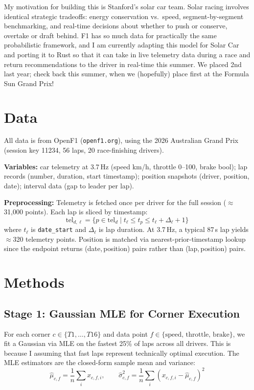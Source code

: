 \documentclass[10pt,twocolumn]{article}
\begin{document}
My motivation for building this is Stanford's solar car team. Solar racing involves identical
strategic tradeoffs: energy conservation vs.\ speed, segment-by-segment
benchmarking, and real-time decisions about whether to push or conserve, overtake or draft behind.
F1 has so much data for practically the same probabilistic framework, and I am
currently adapting this model for Solar Car and porting it to Rust so that it can take in
live telemetry data during a race and return recommendations to the driver in real-time this summer.
We placed 2nd last year; check back this summer, when we (hopefully) place first at the
Formula Sun Grand Prix!

\section{Data}

All data is from OpenF1 (\texttt{openf1.org}), using the 2026 Australian Grand
Prix (session key 11234, 56 laps, 20 race-finishing drivers).

\textbf{Variables:} car telemetry at 3.7\,Hz (speed km/h, throttle 0--100,
brake bool); lap records (number, duration, start timestamp); position snapshots
(driver, position, date); interval data (gap to leader per lap).

\textbf{Preprocessing:} Telemetry is fetched once per driver for the full
session ($\approx$31,000 points). Each lap is sliced by timestamp:
\[
  \text{tel}_{d,\ell} = \{p \in \text{tel}_d \mid t_\ell \le t_p \le t_\ell + \Delta_\ell + 1\}
\]
where $t_\ell$ is \texttt{date\_start} and $\Delta_\ell$ is lap duration. At
3.7\,Hz, a typical 87\,s lap yields $\approx$320 telemetry points. Position is
matched via nearest-prior-timestamp lookup since the endpoint returns
(date,\,position) pairs rather than (lap,\,position) pairs.

\section{Methods}

\subsection{Stage 1: Gaussian MLE for Corner Execution}

For each corner $c \in \{T1,\ldots,T16\}$ and data point
$f \in \{\text{speed, throttle, brake}\}$, we fit a Gaussian via MLE on the
fastest 25\% of laps across all drivers. This is because I assuming that fast laps
represent technically optimal execution. The MLE estimators are the closed-form
sample mean and variance:
\[
  \hat\mu_{c,f} = \frac{1}{n}\sum_i x_{c,f,i}, \qquad
  \hat\sigma^2_{c,f} = \frac{1}{n}\sum_i (x_{c,f,i} - \hat\mu_{c,f})^2
\]
\end{document}
